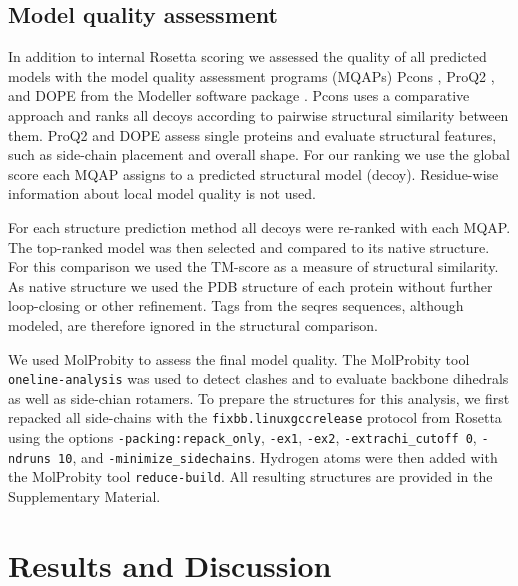 \documentclass{bioinfo}
\begin{document}
\begin{methods}
\subsection{Model quality assessment}
In addition to internal Rosetta scoring we assessed the quality of all
predicted models with the model quality assessment programs (MQAPs)
Pcons \cite[]{lundstrom_pcons:_2001}, ProQ2
\cite[]{ray_improved_2012}, and DOPE from the Modeller software
package \cite[]{eswar_comparative_2006}. Pcons uses a comparative
approach and ranks all decoys according to pairwise structural
similarity between them. ProQ2 and DOPE assess single proteins and
evaluate structural features, such as side-chain placement and overall
shape. For our ranking we use the global score each MQAP assigns to a
predicted structural model (decoy). Residue-wise information about
local model quality is not used. 

For each structure prediction method all decoys were re-ranked with
each MQAP. The top-ranked model was then selected and compared to its
native structure. For this comparison we used the TM-score
\cite[]{zhang_scoring_2004} as a measure of structural similarity. As
native structure we used the PDB structure of each protein without
further loop-closing or other refinement. Tags from the seqres
sequences, although modeled, are therefore ignored in the structural
comparison. 

We used MolProbity \cite[]{chen_molprobity:_2010} to assess the final 
model quality. The MolProbity tool {\tt oneline-analysis} was used to 
detect clashes and to evaluate backbone dihedrals as well as 
side-chian rotamers. To prepare the structures for this analysis, we 
first repacked all side-chains with the {\tt fixbb.linuxgccrelease} 
protocol from Rosetta using the options {\tt -packing:repack\_only}, 
{\tt -ex1}, {\tt -ex2}, {\tt -extrachi\_cutoff 0}, {\tt -ndruns 10}, 
and {\tt -minimize\_sidechains}. Hydrogen atoms were then added 
with the MolProbity tool {\tt reduce-build}. All resulting 
structures are provided in the Supplementary Material.


\end{methods}

\section{Results and Discussion}
\end{document}
